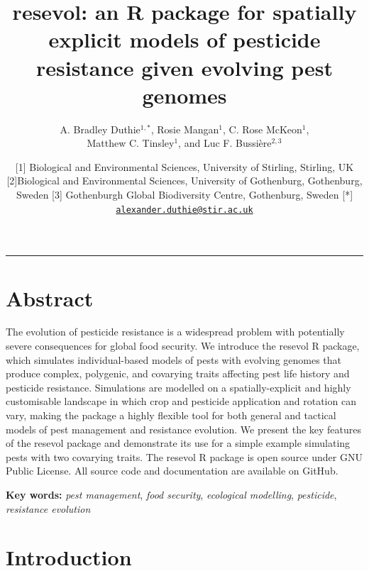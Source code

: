 \documentclass[
]{article}
\title{resevol: an R package for spatially explicit models of pesticide resistance given evolving pest genomes}
\author{A. Bradley Duthie\(^{1,*}\), Rosie Mangan\(^{1}\), C. Rose McKeon\(^{1}\),\\
Matthew C. Tinsley\(^{1}\), and Luc F. Bussière\(^{2,3}\)}
\date{{[}1{]} Biological and Environmental Sciences, University of Stirling, Stirling, UK {[}2{]}Biological and Environmental Sciences, University of Gothenburg, Gothenburg, Sweden {[}3{]} Gothenburgh Global Biodiversity Centre, Gothenburg, Sweden {[}*{]} \href{mailto:alexander.duthie@stir.ac.uk}{\nolinkurl{alexander.duthie@stir.ac.uk}}}
\begin{document}
\maketitle

\begin{center}\rule{0.5\linewidth}{0.5pt}\end{center}

\hypertarget{abstract}{%
\section*{Abstract}\label{abstract}}

The evolution of pesticide resistance is a widespread problem with potentially severe consequences for global food security.
We introduce the resevol R package, which simulates individual-based models of pests with evolving genomes that produce complex, polygenic, and covarying traits affecting pest life history and pesticide resistance.
Simulations are modelled on a spatially-explicit and highly customisable landscape in which crop and pesticide application and rotation can vary, making the package a highly flexible tool for both general and tactical models of pest management and resistance evolution.
We present the key features of the resevol package and demonstrate its use for a simple example simulating pests with two covarying traits.
The resevol R package is open source under GNU Public License. All source code and documentation are available on GitHub.

\textbf{Key words:} \emph{pest management}, \emph{food security}, \emph{ecological modelling}, \emph{pesticide}, \emph{resistance evolution}

\hypertarget{introduction}{%
\section{Introduction}\label{introduction}}
\end{document}
